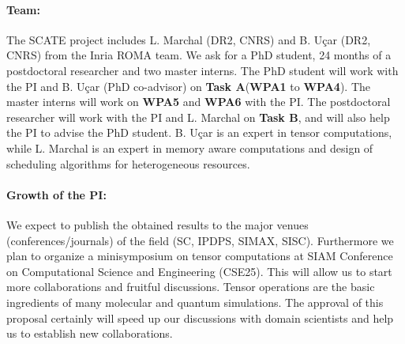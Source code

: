 \documentclass[a4paper,11pt]{article}
\begin{document}
	\paragraph{Team:} The SCATE project includes L. Marchal (DR2, CNRS) and B. Uçar (DR2, CNRS) from the Inria ROMA team. We ask for a PhD student, 24 months of a postdoctoral researcher and two master interns. The PhD student will work with the PI and B. Uçar (PhD co-advisor) on \textbf{Task A}\newline (\textbf{WPA1} to \textbf{WPA4}). The master interns will work on \textbf{WPA5} and \textbf{WPA6} with the PI. The postdoctoral researcher will work with the PI and L. Marchal on \textbf{Task B}, and will also help the PI to advise the PhD student. B. Uçar is an expert in tensor computations, while L. Marchal is an expert in memory aware computations and design of scheduling algorithms for heterogeneous resources.
	


	
	
	\paragraph{Growth of the PI:}
	We expect to publish the obtained results to the major
	venues (conferences/journals) of the field (SC, IPDPS, SIMAX, SISC). Furthermore we plan to organize a minisymposium on tensor computations at SIAM Conference on Computational Science and Engineering (CSE25). This will allow us to start more collaborations and fruitful discussions. Tensor operations are the basic ingredients of many molecular and quantum simulations. The approval of this proposal certainly will speed up our discussions with domain scientists and help us to establish new collaborations. 
	
	
	
	
	
	{\footnotesize
		
		
	}
\vspace*{-0.215cm}
	

	
\end{document}

